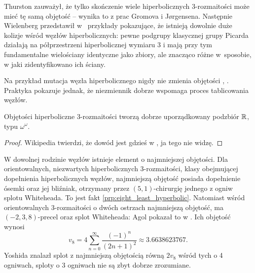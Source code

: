 
Thurston zauważył, że tylko skończenie wiele hiperbolicznych 3-rozmaitości może mieć tę samą objętość -- wynika to z prac Gromova i Jørgensena.
Następnie Wielenberg przedstawił w~\cite{wielenberg81} przykłady pokazujące, że istnieją dowolnie duże kolizje wśród węzłów hiperbolicznych: pewne podgrupy klasycznej grupy Picarda działają  na półprzestrzeni hiperbolicznej wymiaru 3 i mają przy tym fundamentalne wielościany identyczne jako zbiory, ale znacząco różne w~sposobie, w jaki zidentyfikowano ich ściany.

Na przykład mutacja węzła hiperbolicznego nigdy nie zmienia objętości \cite{ruberman87}, \cite[s. 124]{adams94}.
Praktyka pokazuje jednak, że niezmiennik dobrze wspomaga proces tablicowania węzłów.

\begin{proposition}
    Objętości hiperboliczne 3-rozmaitości tworzą dobrze uporządkowany podzbiór $\mathbb R$, typu $\omega^\omega$.
\end{proposition}

\begin{proof}
    Wikipedia twierdzi, że dowód jest gdzieś w \cite{neumann85}, ja tego nie widzę.
\end{proof}

W dowolnej rodzinie węzłów istnieje element o najmniejszej objętości.
Dla orientowalnych, niezwartych hiperbolicznych 3-rozmaitości, klasy obejmującej dopełnienia hiperbolicznych węzłów, najmniejszą objętość posiada dopełnienie ósemki oraz jej bliźniak, otrzymany przez $(5, 1)$-chirurgię jednego z ogniw splotu Whiteheada.
To jest fakt \ref{prp:eight_least_hyperbolic}.
Natomiast wśród orientowalnych 3-rozmaitości o dwóch ostrzach najmniejszą objętość, ma $(-2, 3, 8)$-precel oraz splot Whiteheada: Agol pokazał to w \cite{agol10}.
Ich objętość wynosi
\begin{equation}
    v_8 = 4 \sum_{n=0}^\infty \frac{(-1)^n}{(2n+1)^2} \approx 3.6638623767. %
\end{equation}
Yoshida \cite{yoshida13} znalazł splot z najmniejszą objętością równą $2v_8$ wśród tych o 4 ogniwach, sploty o 3 ogniwach nie są zbyt dobrze zrozumiane.

